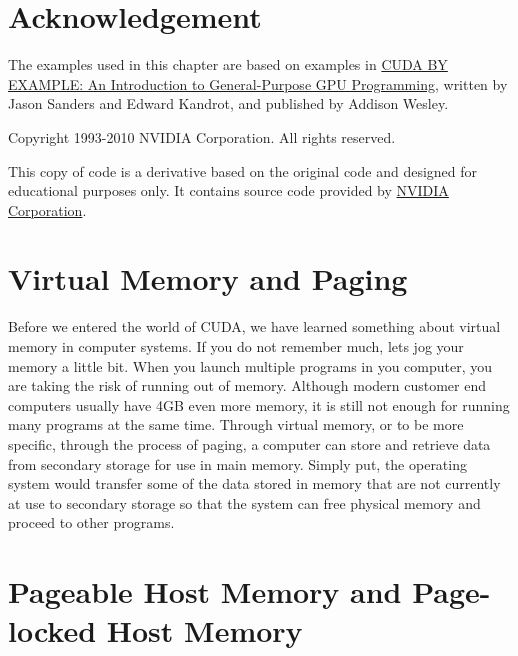 \documentclass[letterpaper,10pt,openany,oneside]{sphinxmanual}
\begin{document}
\section{Acknowledgement}
\label{Streams/Streams:acknowledgement}
The examples used in this chapter are based on examples in \href{http://developer.nvidia.com/content/cuda-example-introduction-general-purpose-gpu-programming-0}{CUDA BY EXAMPLE: An Introduction to General-Purpose GPU Programming}, written by Jason Sanders and Edward Kandrot, and published by Addison Wesley.

Copyright 1993-2010 NVIDIA Corporation.  All rights reserved.

This copy of code is a derivative based on the original code and designed for educational purposes only. It contains source code provided by \href{http://www.nvidia.com}{NVIDIA Corporation}.


\section{Virtual Memory and Paging}
\label{Streams/Streams:virtual-memory-and-paging}\label{Streams/Streams:nvidia-corporation}
Before we entered the world of CUDA, we have learned something about virtual memory in computer systems. If you do not remember much, lets jog your memory a little bit. When you launch multiple programs in you computer, you are taking the risk of running out of memory. Although modern customer end computers usually have 4GB even more memory, it is still not enough for running many programs at the same time. Through virtual memory, or to be more specific, through the process of paging, a computer can store and retrieve data from secondary storage for use in main memory. Simply put, the operating system would transfer some of the data stored in memory that are not currently at use to secondary storage so that the system can free physical memory and proceed to other programs.


\section{Pageable Host Memory and Page-locked Host Memory}
\label{Streams/Streams:pageable-host-memory-and-page-locked-host-memory}
\end{document}
